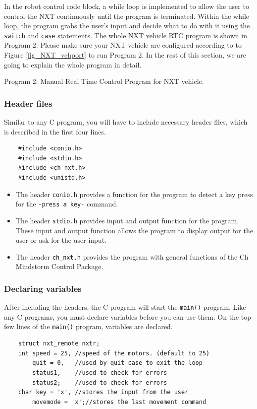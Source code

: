 \documentclass[12pt]{article}
\begin{document}
\noindent
In the robot control code block, a while loop is implemented to allow the user to control the NXT
    continuously until the program is terminated.
Within the while loop, the program grabs the user's input and decide what to do with it using
    the \verb+switch+ and \verb+case+ statements.
The whole NXT vehicle RTC program is shown in Program 2.
Please make sure your NXT vehicle are configured according to to Figure \ref{fig_NXT_vehport} to run Program 2.
In the rest of this section, we are going to explain the whole program in detail.


\begin{center}
Program 2: Manual Real Time Control Program for NXT vehicle.
\end{center}

\subsubsection*{Header files}
Similar to any C program, you will have to include necessary header files, which is described in the first four
    lines.
    
\begin{verbatim}
    #include <conio.h>
    #include <stdio.h>
    #include <ch_nxt.h>
    #include <unistd.h>
\end{verbatim}

\begin{itemize}
\item The header \verb+conio.h+ provides a function for the program to detect a key press for the
    \verb+-press a key-+ command.
\item The header \verb+stdio.h+ provides input and output function for the program.
    These input and output function allows the program to display output for the user or ask for the user input.
\item The header \verb+ch_nxt.h+ provides the program with general functions of the Ch Mindstorm Control Package.
\end{itemize}

\subsubsection*{Declaring variables}
After including the headers, the C program will start the \verb+main()+ program.
Like any C programs, you must declare variables before you can use them.
On the top few lines of the \verb+main()+ program, variables are declared.
\begin{verbatim}
    struct nxt_remote nxtr;
    int speed = 25,	//speed of the motors. (default to 25)
        quit = 0,	//used by quit case to exit the loop
        status1,	//used to check for errors
        status2;	//used to check for errors
    char key = 'x',	//stores the input from the user
        movemode = 'x';//stores the last movement command
\end{verbatim}
\end{document}
